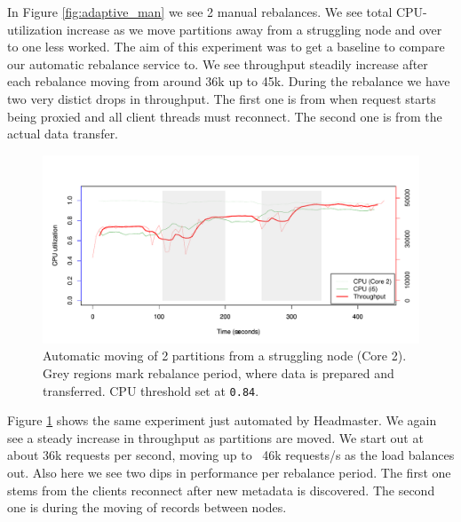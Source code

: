 In Figure \ref{fig:adaptive_man} we see 2 manual rebalances. We see total CPU-utilization increase as we move partitions away from a struggling node and over to one less worked. The aim of this experiment was to get a baseline to compare our automatic rebalance service to. We see throughput steadily increase after each rebalance moving from around 36k up to 45k. During the rebalance we have two very distict drops in throughput. The first one is from when request starts being proxied and all client threads must reconnect. The second one is from the actual data transfer. 

\clearpage
\begin{figure}[h]
    \centering
    \includegraphics[width=1.2\textwidth]{results/rebalance_auto_2node}
    \caption{Automatic moving of 2 partitions from a struggling node (Core 2). Grey regions mark rebalance period, where data is prepared and transferred. CPU threshold set at \texttt{0.84}.}
    \label{fig:adaptive_auto}
\end{figure}
Figure \ref{fig:adaptive_auto} shows the same experiment just automated by Headmaster. We again see a steady increase in throughput as partitions are moved. We start out at about 36k requests per second, moving up to ~46k requests/s as the load balances out. Also here we see two dips in performance per rebalance period. The first one stems from the clients reconnect after new metadata is discovered. The second one is during the moving of records between nodes.

